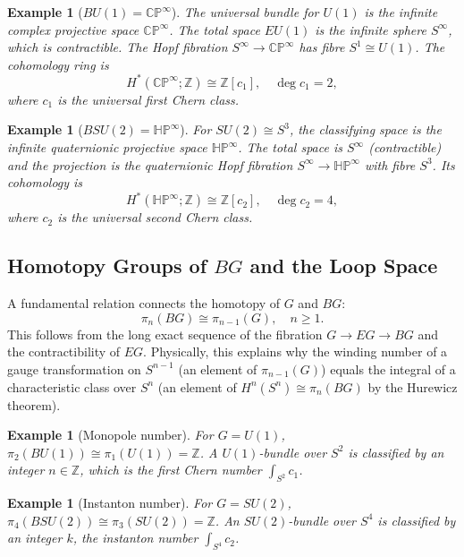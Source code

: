 \documentclass[11pt]{article}
\newcommand{\Z}{\mathbb{Z}}
\newcommand{\CP}{\mathbb{CP}}
\newcommand{\HP}{\mathbb{HP}}
\newtheorem{example}[theorem]{Example}
\begin{document}
\begin{example}[\(BU(1)=\CP^\infty\)]
The universal bundle for \(U(1)\) is the infinite complex projective space \(\CP^\infty\). The total space \(EU(1)\) is the infinite sphere \(S^\infty\), which is contractible. The Hopf fibration \(S^\infty\to \CP^\infty\) has fibre \(S^1\cong U(1)\). The cohomology ring is
\[
H^*(\CP^\infty;\Z) \cong \Z[c_1], \quad \deg c_1 = 2,
\]
where \(c_1\) is the universal first Chern class.
\end{example}

\begin{example}[\(BSU(2)=\HP^\infty\)]
For \(SU(2)\cong S^3\), the classifying space is the infinite quaternionic projective space \(\HP^\infty\). The total space is \(S^\infty\) (contractible) and the projection is the quaternionic Hopf fibration \(S^\infty\to \HP^\infty\) with fibre \(S^3\). Its cohomology is
\[
H^*(\HP^\infty;\Z) \cong \Z[c_2], \quad \deg c_2 = 4,
\]
where \(c_2\) is the universal second Chern class.
\end{example}

\subsection{Homotopy Groups of \(BG\) and the Loop Space}
A fundamental relation connects the homotopy of \(G\) and \(BG\):
\[
\pi_n(BG) \cong \pi_{n-1}(G), \quad n\ge 1.
\]
This follows from the long exact sequence of the fibration \(G\to EG\to BG\) and the contractibility of \(EG\). Physically, this explains why the winding number of a gauge transformation on \(S^{n-1}\) (an element of \(\pi_{n-1}(G)\)) equals the integral of a characteristic class over \(S^n\) (an element of \(H^n(S^n)\cong\pi_n(BG)\) by the Hurewicz theorem).

\begin{example}[Monopole number]
For \(G=U(1)\), \(\pi_2(BU(1)) \cong \pi_1(U(1)) = \Z\). A \(U(1)\)-bundle over \(S^2\) is classified by an integer \(n\in\Z\), which is the first Chern number \(\int_{S^2} c_1\).
\end{example}

\begin{example}[Instanton number]
For \(G=SU(2)\), \(\pi_4(BSU(2)) \cong \pi_3(SU(2)) = \Z\). An \(SU(2)\)-bundle over \(S^4\) is classified by an integer \(k\), the instanton number \(\int_{S^4} c_2\).
\end{example}

\end{document}
